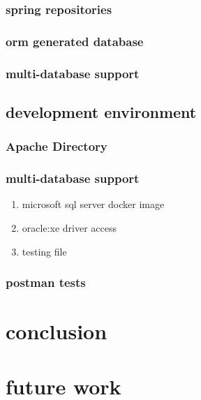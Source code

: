 \documentclass[11pt]{article}
\begin{document}
\subsubsection{spring repositories}
\label{sec:org6010968}
\subsubsection{orm generated database}
\label{sec:org01549e4}
\subsubsection{multi-database support}
\label{sec:org3a0d954}

\subsection{development environment}
\label{sec:org6e5ac2b}
\subsubsection{Apache Directory}
\label{sec:org8f6520a}
\subsubsection{multi-database support}
\label{sec:org982b708}
\begin{enumerate}
\item microsoft sql server docker image
\label{sec:orgccf16c8}
\item oracle:xe driver access
\label{sec:orgd7c71db}
\item testing file
\label{sec:org567f974}
\end{enumerate}
\subsubsection{postman tests}
\label{sec:orgf2f2181}
\section{conclusion}
\label{sec:org774b136}
\section{future work}
\label{sec:orgf6809ce}
\end{document}
